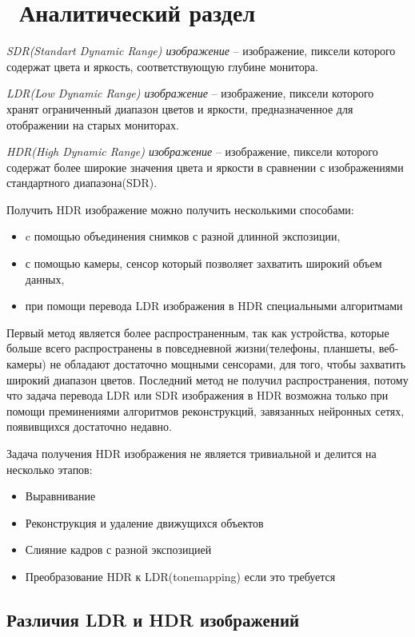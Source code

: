 \chapter{ Аналитический раздел}
\label{cha:analysis}

\textit{SDR(Standart Dynamic Range) изображение} -- изображение, пиксели которого содержат цвета и яркость, соответствующую глубине монитора.

\textit{LDR(Low Dynamic Range) изображение} -- изображение, пиксели которого хранят ограниченный диапазон цветов и яркости, предназначенное для отображении на старых мониторах.

\textit{HDR(High Dynamic Range) изображение} -- изображение, пиксели которого содержат более широкие значения цвета и яркости в сравнении с изображениями стандартного диапазона(SDR).

Получить HDR изображение можно получить несколькими способами: 
\begin{itemize}
    \item c помощью объединения снимков с разной длинной экспозиции,
    \item с помощью камеры, сенсор который позволяет захватить широкий объем данных,
    \item при помощи перевода LDR изображения в HDR специальными алгоритмами
\end{itemize}

Первый метод является более распространенным, так как устройства, которые больше всего распространены в повседневной жизни(телефоны, планшеты, веб-камеры) не обладают достаточно мощными сенсорами, для того, чтобы захватить широкий диапазон цветов. Последний метод не получил распространения, потому что задача перевода LDR или SDR изображения в HDR возможна только при помощи преминениями алгоритмов реконструкций, завязанных нейронных сетях, появивщихся достаточно недавно.

Задача получения HDR изображения не является тривиальной и делится на несколько этапов:
\begin{itemize}
    \item Выравнивание
    \item Реконструкция и удаление движущихся объектов
    \item Слияние кадров с разной экспозицией
    \item Преобразование HDR к LDR(tonemapping) если это требуется
\end{itemize}

\section{ Различия LDR и HDR изображений}

